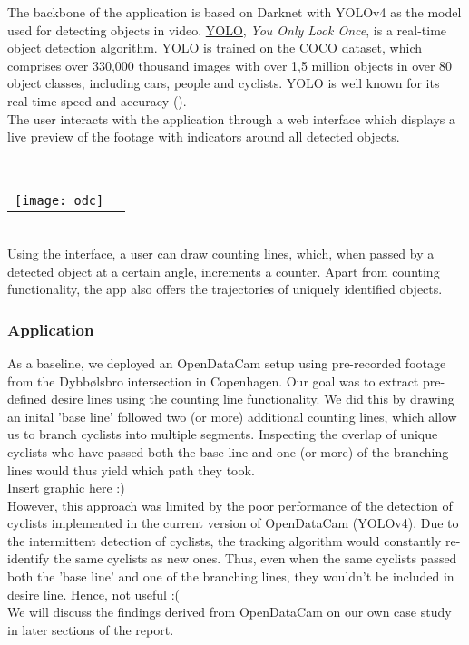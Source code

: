 The backbone of the application is based on Darknet with YOLOv4 as the model used for detecting objects in video.
\href{https://pjreddie.com/darknet/yolo/}{YOLO}, \textit{You Only Look Once}, is a real-time object detection algorithm. 
YOLO is trained on the \href{https://cocodataset.org}{COCO dataset}, which comprises over 330,000 thousand images
with over 1,5 million objects in over 80 object classes, including cars, people and cyclists. 
YOLO is well known for its real-time speed and accuracy (\cite{redmon2016look}).
\ \\

The user interacts with the application through a web interface which displays a live preview of the footage with
indicators around all detected objects.

\ \\
\raggedbottom
\noindent
\begin{tabular}{@{}cc}
\texttt{[image: odc]} 
\end{tabular}
\ \\

Using the interface, a user can draw counting lines, which, when passed by a detected object at a certain angle, 
increments a counter. Apart from counting functionality, the app also offers the trajectories of uniquely identified objects. 

\raggedbottom
\subsubsection{Application}
As a baseline, we deployed an OpenDataCam setup using pre-recorded footage from the Dybbølsbro intersection in Copenhagen.
Our goal was to extract pre-defined desire lines using the counting line functionality. We did this by drawing an inital 
'base line' followed two (or more) additional counting lines, which allow us to branch cyclists into multiple segments. Inspecting the
overlap of unique cyclists who have passed both the base line and one (or more) of the branching lines would thus yield which path
they took. 
\ \\

\color{red}
Insert graphic here :) 
\color{black}
\ \\

However, this approach was limited by the poor performance of the detection of cyclists implemented in the current 
version of OpenDataCam (YOLOv4). Due to the intermittent detection of cyclists, the tracking algorithm would constantly 
re-identify the same cyclists as new ones. Thus, even when the same cyclists passed both the 'base line' and one of the 
branching lines, they wouldn't be included in desire line. Hence, not useful :(
\ \\

We will discuss the findings derived from OpenDataCam on our own case study in later sections of the report.
